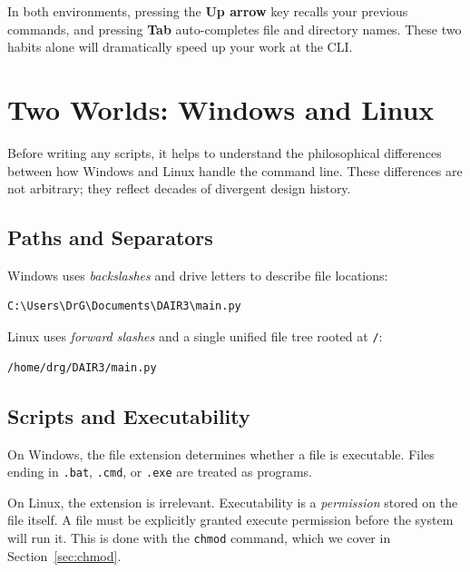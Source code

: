 \begin{tipbox}
In both environments, pressing the \textbf{Up arrow} key recalls your
previous commands, and pressing \textbf{Tab} auto-completes file and
directory names. These two habits alone will dramatically speed up your
work at the CLI.
\end{tipbox}

\section{Two Worlds: Windows and Linux}
\label{sec:two-worlds}

Before writing any scripts, it helps to understand the philosophical
differences between how Windows and Linux handle the command line. These
differences are not arbitrary; they reflect decades of divergent design
history.

\subsection{Paths and Separators}

Windows uses \emph{backslashes} and drive letters to describe file
locations:
\begin{lstlisting}[style=windowsStyle]
C:\Users\DrG\Documents\DAIR3\main.py
\end{lstlisting}

Linux uses \emph{forward slashes} and a single unified file tree rooted
at \texttt{/}:
\begin{lstlisting}[style=linuxStyle]
/home/drg/DAIR3/main.py
\end{lstlisting}

\subsection{Scripts and Executability}

On Windows, the file extension determines whether a file is executable.
Files ending in \texttt{.bat}, \texttt{.cmd}, or \texttt{.exe} are treated
as programs.

On Linux, the extension is irrelevant. Executability is a \emph{permission}
stored on the file itself. A file must be explicitly granted execute
permission before the system will run it. This is done with the
\texttt{chmod} command, which we cover in Section~\ref{sec:chmod}.

